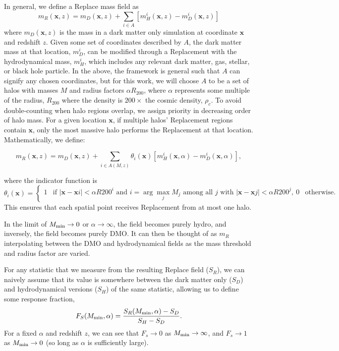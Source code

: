 \documentclass[linenumbers,trackchanges]{aastex701}
\begin{document}
In general, we define a Replace mass field as
\begin{equation}\label{eq:general_Replace_density}
m_{R}(\bm{x}, z) = m_D(\bm{x}, z)  + \sum_{i \in A} \left[m_H^i(\bm{x}, z) - m_{D}^i(\bm{x}, z)\right]
\end{equation}
where $m_D(\bm{x}, z)$ is the mass in a dark matter only simulation at coordinate $\bm{x}$ and redshift $z$. Given some set of coordinates described by $A$, the dark matter mass at that location, $m_D^i$, can be modified through a Replacement with the hydrodynamical mass, $m_H^i$, which includes any relevant dark matter, gas, stellar, or black hole particle. In the above, the framework is general such that $A$ can signify any chosen coordinates, but for this work, we will choose $A$ to be a set of halos with masses $M$ and radius factors $\alpha R_{200}$, where $\alpha$ represents some multiple of the radius, $R_{200}$ where the density is $200\times$ the cosmic density, $\rho_{c}$. To avoid double-counting when halo regions overlap, we assign priority in decreasing order of halo mass. For a given location $\bm{x}$, if multiple halos’ Replacement regions contain $\bm{x}$, only the most massive halo performs the Replacement at that location.
Mathematically, we define:

\begin{equation}\label{eq:Replace}
m_R(\bm{x},z) = m_D(\bm{x},z) + \sum_{i \in A(M,z)} \theta_i(\bm{x})
\left[m_H^i(\bm{x},\alpha) - m_D^i(\bm{x},\alpha)\right],
\end{equation}

where the indicator function is
\begin{equation}
\theta_i(\bm{x}) = \begin{cases}
1 & \text{if } |\bm{x}-\bm{x}i| < \alpha R{200}^i \text{ and } i = \arg\max_j M_j
\text{ among all } j \text{ with } |\bm{x}-\bm{x}j| < \alpha R{200}^j, \
0 & \text{otherwise}.
\end{cases}
\end{equation}
This ensures that each spatial point receives Replacement from at most one halo.

In the limit of $M_{\rm min}\rightarrow 0$ or $\alpha\rightarrow\infty$, the field becomes purely hydro, and inversely, the field becomes purely DMO. It can then be thought of as $m_R$ interpolating between the DMO and hydrodynamical fields as the mass threshold and radius factor are varied.

For any statistic that we measure from the resulting Replace field ($S_R$), we can naively assume that its value is somewhere between the dark matter only ($S_D$) and hydrodynamical versions ($S_H$) of the same statistic, allowing us to define some response fraction,
\begin{equation}\label{eq:cum_resp_func}
F_S(M_{\rm min}, \alpha) = \dfrac{S_R(M_{\rm min}, \alpha) - S_D}{S_H-S_D}.
\end{equation}
For a fixed $\alpha$ and redshift $z$, we can see that $F_s\rightarrow 0$ as $M_{\rm min}\rightarrow \infty$, and $F_s\rightarrow1$ as $M_{\rm min}\rightarrow0$ (so long as $\alpha$ is sufficiently large).
\end{document}
